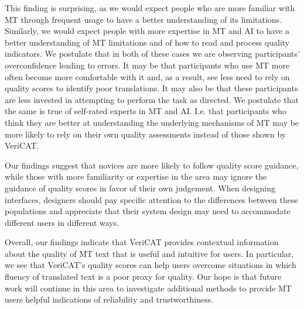 This finding is surprising, as we would expect people who are more familiar with MT through frequent usage to have a better understanding of its limitations. Similarly, we would expect people with more expertise in MT and AI to have a better understanding of MT limitations and of how to read and process quality indicators. We postulate that in both of these cases we are observing participants' overconfidence leading to errors. It may be that participants who use MT more often become more comfortable with it and, as a result, see less need to rely on quality scores to identify poor translations. It may also be that these participants are less invested in attempting to perform the task as directed. We postulate that the same is true of self-rated experts in MT and AI. I.e. that participants who think they are better at understanding the underlying mechanisms of MT may be more likely to rely on their own quality assessments instead of those shown by VeriCAT.

Our findings suggest that novices are more likely to follow quality score guidance, while those with more familiarity or expertise in the area may ignore the guidance of quality scores in favor of their own judgement. When designing interfaces, designers should pay specific attention to the differences between these populations and appreciate that their system design may need to accommodate different users in different ways. 

Overall, our findings indicate that VeriCAT provides contextual information about the quality of MT text that is useful and intuitive for users. In particular, we see that VeriCAT's quality scores can help users overcome situations in which fluency of translated text is a poor proxy for quality. Our hope is that future work will continue in this area to investigate additional methods to provide MT users helpful indications of reliability and trustworthiness.     



